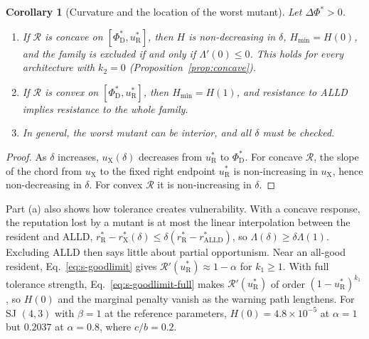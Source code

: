 \documentclass[10pt]{wlscirep}
\newcommand{\Rmap}{\mathscr{R}}            %
\newcommand{\rR}{r_{\mathrm{R}}^{*}}
\newcommand{\uR}{u_{\mathrm{R}}^{*}}
\newcommand{\rX}{r_{\mathrm{X}}^{*}}
\newcommand{\uX}{u_{\mathrm{X}}}
\newcommand{\PhiDs}{\Phi^{*}_{\mathrm{D}}}
\newcommand{\dPhi}{\Delta\Phi^{*}}
\newcommand{\Hmin}{H_{\min}}
\newcommand{\ALLD}{\mathrm{ALLD}}
\theoremstyle{plain}
\newtheorem{corollary}[lemma]{Corollary}
\theoremstyle{remark}
\begin{document}
\begin{corollary}[Curvature and the location of the worst mutant]\label{cor:curvature}
Let $\dPhi>0$.
\begin{enumerate}
\item[(a)] If $\Rmap$ is concave on $[\PhiDs,\uR]$, then $H$ is non-decreasing in $\delta$, $\Hmin=H(0)$, and the family is excluded if and only if $\Lambda'(0)\leq0$. This holds for every architecture with $k_2=0$ (Proposition~\ref{prop:concave}).
\item[(b)] If $\Rmap$ is convex on $[\PhiDs,\uR]$, then $\Hmin=H(1)$, and resistance to ALLD implies resistance to the whole family.
\item[(c)] In general, the worst mutant can be interior, and all $\delta$ must be checked.
\end{enumerate}
\end{corollary}
\begin{proof}
As $\delta$ increases, $\uX(\delta)$ decreases from $\uR$ to $\PhiDs$. For concave $\Rmap$, the slope of the chord from $\uX$ to the fixed right endpoint $\uR$ is non-increasing in $\uX$, hence non-decreasing in $\delta$. For convex $\Rmap$ it is non-increasing in $\delta$.
\end{proof}

Part (a) also shows how tolerance creates vulnerability. With a concave response, the reputation lost by a mutant is at most the linear interpolation between the resident and ALLD, $\rR-\rX(\delta)\leq\delta(\rR-r^*_{\ALLD})$, so $\Lambda(\delta)\geq\delta\Lambda(1)$. Excluding ALLD then says little about partial opportunism. Near an all-good resident, Eq.~\eqref{eq:s-goodlimit} gives $\Rmap'(\uR)\approx1-\alpha$ for $k_1\geq1$. With full tolerance strength, Eq.~\eqref{eq:s-goodlimit-full} makes $\Rmap'(\uR)$ of order $(1-\uR)^{k_1}$, so $H(0)$ and the marginal penalty vanish as the warning path lengthens. For SJ $(4,3)$ with $\beta=1$ at the reference parameters, $H(0)=4.8\times10^{-5}$ at $\alpha=1$ but $0.2037$ at $\alpha=0.8$, where $c/b=0.2$.
\end{document}
